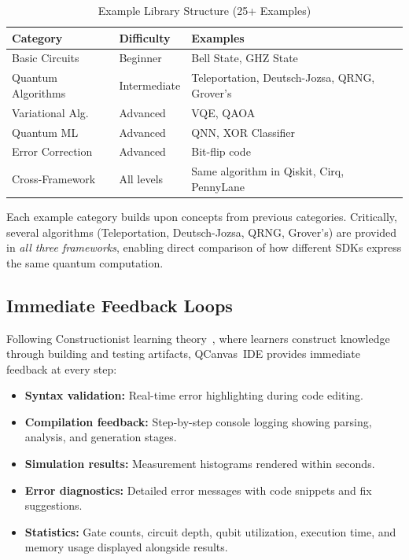 \documentclass[conference]{IEEEtran}
\begin{document}
\begin{table}[t]
\centering
\caption{Example Library Structure (25+ Examples)}
\label{tab:examples}
\begin{tabular}{@{}p{2.5cm}p{2.2cm}p{2.5cm}@{}}
\toprule
\textbf{Category} & \textbf{Difficulty} & \textbf{Examples} \\
\midrule
Basic Circuits       & Beginner     & Bell State, GHZ State \\
Quantum Algorithms   & Intermediate & Teleportation, Deutsch-Jozsa, QRNG, Grover's \\
Variational Alg.     & Advanced     & VQE, QAOA \\
Quantum ML           & Advanced     & QNN, XOR Classifier \\
Error Correction     & Advanced     & Bit-flip code \\
Cross-Framework      & All levels   & Same algorithm in Qiskit, Cirq, PennyLane \\
\bottomrule
\end{tabular}
\end{table}

Each example category builds upon concepts from previous categories. Critically, several algorithms (Teleportation, Deutsch-Jozsa, QRNG, Grover's) are provided in \emph{all three frameworks}, enabling direct comparison of how different SDKs express the same quantum computation.

\subsection{Immediate Feedback Loops}

Following Constructionist learning theory~\cite{papert1991situating}, where learners construct knowledge through building and testing artifacts, QCanvas~IDE provides immediate feedback at every step:

\begin{itemize}
    \item \textbf{Syntax validation:} Real-time error highlighting during code editing.
    \item \textbf{Compilation feedback:} Step-by-step console logging showing parsing, analysis, and generation stages.
    \item \textbf{Simulation results:} Measurement histograms rendered within seconds.
    \item \textbf{Error diagnostics:} Detailed error messages with code snippets and fix suggestions.
    \item \textbf{Statistics:} Gate counts, circuit depth, qubit utilization, execution time, and memory usage displayed alongside results.
\end{itemize}
\end{document}
